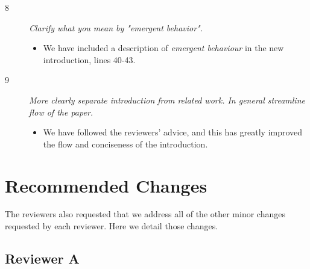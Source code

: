 \documentclass[11pt]{amsart}
\begin{document}
 \begin{description}
 
 \item[8]
 \emph{
 Clarify what you mean by "emergent behavior".
 }
 \begin{itemize}
 \item
We have included a description of \emph{emergent behaviour}
in the new introduction, lines 40-43.
 
 \end{itemize}
 
 \item[9]
 \emph{
 More clearly separate introduction from related work. In general streamline flow of the paper.
 }
 \begin{itemize}
 \item
We have followed the reviewers' advice, and 
this has greatly improved the flow and conciseness of the introduction.
 
 \end{itemize}
 
 \end{description}
 
 \section{Recommended Changes}
 The reviewers also requested that we address all of the other minor 
 changes requested by each reviewer. Here we detail those changes.

 

\subsection{Reviewer A}
\end{document}
